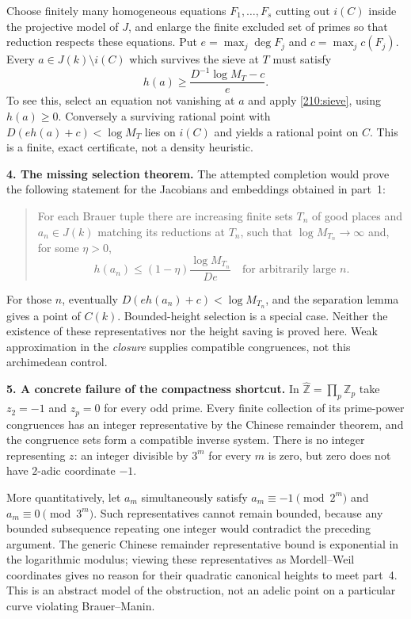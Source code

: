 \documentclass[11pt,a4paper]{article}
\newcommand{\Z}{\mathbb{Z}}
\begin{document}
Choose finitely many homogeneous equations $F_1,\ldots,F_s$ cutting out
$i(C)$ inside the projective model of $J$, and enlarge the finite excluded
set of primes so that reduction respects these equations. Put
$e=\max_j\deg F_j$ and $c=\max_jc(F_j)$. Every
$a\in J(k)\setminus i(C)$ which survives the sieve at $T$ must satisfy
\begin{equation}\label{210:separation}
 h(a)\ge\frac{D^{-1}\log M_T-c}{e}.
\end{equation}
To see this, select an equation not vanishing at $a$ and apply
\eqref{210:sieve}, using $h(a)\ge0$. Conversely a surviving rational point
with $D(eh(a)+c)<\log M_T$ lies on $i(C)$ and yields a rational point on
$C$. This is a finite, exact certificate, not a density heuristic.

\textbf{4. The missing selection theorem.}
The attempted completion would prove the following statement for the
Jacobians and embeddings obtained in part~1:
\begin{quote}\small
For each Brauer tuple there are increasing finite sets $T_n$ of good
places and $a_n\in J(k)$ matching its reductions at $T_n$, such that
$\log M_{T_n}\to\infty$ and, for some $\eta>0$,
\[
 h(a_n)\le(1-\eta)\frac{\log M_{T_n}}{De}
 \quad\text{for arbitrarily large }n.
\]
\end{quote}
For those $n$, eventually $D(eh(a_n)+c)<\log M_{T_n}$, and the separation
lemma gives a point of $C(k)$. Bounded-height selection is a special case.
Neither the existence of these representatives nor the height saving is
proved here. Weak approximation in the \emph{closure} supplies compatible
congruences, not this archimedean control.

\textbf{5. A concrete failure of the compactness shortcut.}
In $\widehat{\Z}=\prod_p\Z_p$ take $z_2=-1$ and $z_p=0$ for every odd prime.
Every finite collection of its prime-power congruences has an integer
representative by the Chinese remainder theorem, and the congruence sets
form a compatible inverse system. There is no integer representing $z$:
an integer divisible by $3^m$ for every $m$ is zero, but zero does not
have $2$-adic coordinate $-1$.

More quantitatively, let $a_m$ simultaneously satisfy
$a_m\equiv-1\pmod{2^m}$ and $a_m\equiv0\pmod{3^m}$. Such representatives
cannot remain bounded, because any bounded subsequence repeating one
integer would contradict the preceding argument. The generic Chinese
remainder representative bound is exponential in the logarithmic modulus;
viewing these representatives as Mordell--Weil coordinates gives no
reason for their quadratic canonical heights to meet part~4. This is an
abstract model of the obstruction, not an adelic point on a particular
curve violating Brauer--Manin.
\end{document}
